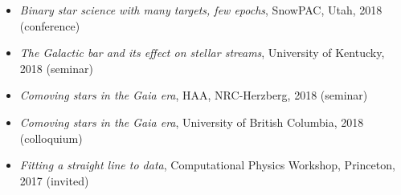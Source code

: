 \documentclass[12pt, letterpaper]{apw-cv}
\begin{document}
\begin{itemize}
    \item \emph{Binary star science with many targets, few epochs}, SnowPAC, Utah, 2018 (conference)
    \item \emph{The Galactic bar and its effect on stellar streams}, University of Kentucky, 2018 (seminar)
    \item \emph{Comoving stars in the Gaia era}, HAA, NRC-Herzberg, 2018 (seminar)
    \item \emph{Comoving stars in the Gaia era}, University of British Columbia, 2018 (colloquium)
    \item \emph{Fitting a straight line to data}, Computational Physics Workshop, Princeton, 2017 (invited)

\end{itemize}
\end{document}
